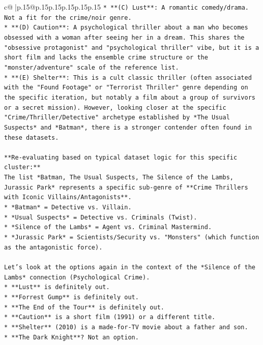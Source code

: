 \documentclass{article}
\begin{document}
{\begin{supertabular}{c@{$\;$}|p{.15\linewidth}@{}p{.15\linewidth}p{.15\linewidth}p{.15\linewidth}p{.15\linewidth}p{.15\linewidth}}
{{{\texttt{*   **(C) Lust**: A romantic comedy/drama. Not a fit for the crime/noir genre.} \\
\texttt{*   **(D) Caution**: A psychological thriller about a man who becomes obsessed with a woman after seeing her in a dream. This shares the "obsessive protagonist" and "psychological thriller" vibe, but it is a short film and lacks the ensemble crime structure or the "monster/adventure" scale of the reference list.} \\
\texttt{*   **(E) Shelter**: This is a cult classic thriller (often associated with the "Found Footage" or "Terrorist Thriller" genre depending on the specific iteration, but notably a film about a group of survivors or a secret mission). However, looking closer at the specific "Crime/Thriller/Detective" archetype established by *The Usual Suspects* and *Batman*, there is a stronger contender often found in these datasets.} \\
\\ 
\texttt{**Re{-}evaluating based on typical dataset logic for this specific cluster:**} \\
\texttt{The list *Batman, The Usual Suspects, The Silence of the Lambs, Jurassic Park* represents a specific sub{-}genre of **Crime Thrillers with Iconic Villains/Antagonists**.} \\
\texttt{*   *Batman* = Detective vs. Villain.} \\
\texttt{*   *Usual Suspects* = Detective vs. Criminals (Twist).} \\
\texttt{*   *Silence of the Lambs* = Agent vs. Criminal Mastermind.} \\
\texttt{*   *Jurassic Park* = Scientists/Security vs. "Monsters" (which function as the antagonistic force).} \\
\\ 
\texttt{Let's look at the options again in the context of the *Silence of the Lambs* connection (Psychological Crime).} \\
\texttt{*   **Lust** is definitely out.} \\
\texttt{*   **Forrest Gump** is definitely out.} \\
\texttt{*   **The End of the Tour** is definitely out.} \\
\texttt{*   **Caution** is a short film (1991) or a different title.} \\
\texttt{*   **Shelter** (2010) is a made{-}for{-}TV movie about a father and son.} \\
\texttt{*   **The Dark Knight**? Not an option.} \\
}}}
\end{supertabular}}
\end{document}
